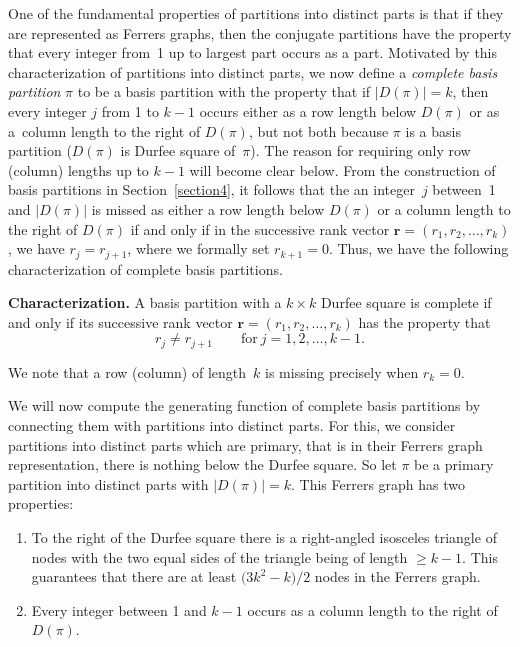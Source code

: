 \documentclass[10pt,a4paper]{amsart}
\numberwithin{equation}{section}
\theoremstyle{definition}
\begin{document}
One of the fundamental properties of partitions into distinct parts is that
if they are represented as Ferrers graphs, then the conjugate partitions have
the property that every integer from~1 up to largest part occurs as a part.
Motivated by this characterization of partitions into distinct parts, we now
define a {\it complete basis partition} $\pi$ to be a basis partition
with the property that if $|D(\pi)|=k$, then every integer $j$ from 1 to $k-1$
occurs either as a row length below $D(\pi)$ or as a~column length to the
right of $D(\pi)$, but not both because $\pi$ is a basis partition ($D(\pi)$ is Durfee square of~$\pi$). The reason
for requiring only row (column) lengths up to $k-1$ will become clear below.
From the
construction of basis partitions in Section~\ref{section4}, it follows that the an integer~$j$
between~1 and $|D(\pi)|$ is missed as either a row length below $D(\pi)$
or a column length to the right of $D(\pi)$ if and only if in the successive
rank vector $\mathbf{r}=(r_1,r_2,\dots ,r_k)$, we have $r_j=r_{j+1}$, where we
formally set $r_{k+1}=0$. Thus, we have the following characterization of
complete basis partitions.

{\bf Characterization.} A basis partition with a $k\times k$
Durfee square is complete if and only if its successive rank vector
$\mathbf{r}=(r_1,r_2,\dots ,r_k)$ has the property that
\begin{equation*}
r_j\ne r_{j+1} \qquad \text{for} \ j=1,2,\dots ,k-1.%
\end{equation*}

We note that a row (column) of length~$k$ is missing precisely when $r_k=0$.

We will now compute the generating function of complete basis partitions by
connecting them with partitions into distinct parts. For this, we consider
partitions into distinct parts which are primary, that is in their Ferrers
graph representation, there is nothing below the Durfee square. So let $\pi$
be a primary partition into distinct parts with $|D(\pi)|=k$. This Ferrers
graph has two properties:
\begin{enumerate}\itemsep=0pt
\item[(i)] To the right of the Durfee square there is a right-angled
isosceles triangle of nodes with the two equal sides of the triangle being
of length $\ge k-1$. This guarantees that there are at least $\bigl(3k^2-k\bigr)/2$ nodes
in the Ferrers graph.
\item[(ii)] Every integer between 1 and $k-1$ occurs as a column length to the right
of $D(\pi)$.
\end{enumerate}
\end{document}
